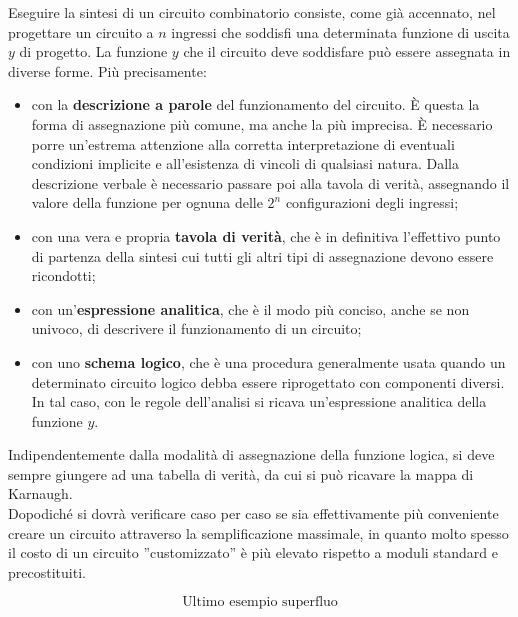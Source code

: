 \documentclass[a4paper]{extarticle}
\newcommand{\quotes}[1]{''#1''}
\begin{document}
\noindent
Eseguire la sintesi di un circuito combinatorio consiste, come già accennato, nel progettare un circuito a \(n\) ingressi che soddisfi una determinata funzione di uscita \(y\) di progetto. La funzione \(y\) che il circuito deve soddisfare può essere assegnata in diverse forme. Più precisamente:

\begin{itemize}
    \item con la \textbf{descrizione a parole} del funzionamento del circuito. È questa la forma di assegnazione più comune, ma anche la più imprecisa. È necessario porre un’estrema attenzione alla corretta interpretazione di eventuali condizioni implicite e all’esistenza di vincoli di qualsiasi natura. Dalla descrizione verbale è necessario passare poi alla tavola di verità, assegnando il valore della funzione per ognuna delle \(2^n\) configurazioni degli ingressi;

    \item con una vera e propria \textbf{tavola di verità}, che è in definitiva l’effettivo punto di partenza della sintesi cui tutti gli altri tipi di assegnazione devono essere ricondotti;

    \item con un’\textbf{espressione analitica}, che è il modo più conciso, anche se non univoco, di descrivere il funzionamento di un circuito;

    \item con uno \textbf{schema logico}, che è una procedura generalmente usata quando un determinato circuito logico debba essere riprogettato con componenti diversi. In tal caso, con le regole dell’analisi si ricava un’espressione analitica della funzione $y$.
\end{itemize}

\noindent
Indipendentemente dalla modalità di assegnazione della funzione logica, si deve sempre giungere ad una tabella di verità, da cui si può ricavare la mappa di Karnaugh.\\
Dopodiché si dovrà verificare caso per caso se sia effettivamente più conveniente creare un circuito attraverso la semplificazione massimale, in quanto molto spesso il costo di un circuito \quotes{customizzato} è più elevato rispetto a moduli standard e precostituiti.

\[\text{Ultimo esempio superfluo}\]

\vspace{1em}
\end{document}
